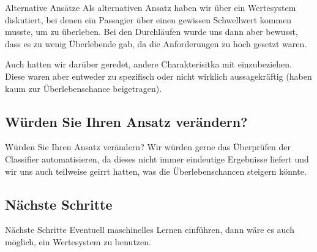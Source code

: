 \documentclass[compress]{beamer}
\begin{document}
\begin{frame}{Alternative Ansätze}
  Als alternativen Ansatz haben wir über ein Wertesystem diskutiert,
  bei denen ein Passagier über einen gewissen Schwellwert kommen
  musste, um zu überleben. Bei den Durchläufen wurde uns dann aber
  bewusst, dass es zu wenig Überlebende gab, da die Anforderungen
  zu hoch gesetzt waren.

  \bigskip Auch hatten wir darüber geredet, andere Charakterisitka mit
  einzubeziehen. Diese waren aber entweder zu spezifisch oder nicht
  wirklich aussagekräftig (haben kaum zur Überlebenschance beigetragen).
\end{frame}

\subsection{Würden Sie Ihren Ansatz verändern?}
\label{subsec:veraendern}

\begin{frame}{Würden Sie Ihren Ansatz verändern?}
  Wir würden gerne das Überprüfen der Classifier automatisieren, da
  dieses nicht immer eindeutige Ergebnisse liefert und wir uns auch
  teilweise geirrt hatten, was die Überlebenschancen steigern könnte.
\end{frame}

\subsection{Nächste Schritte}
\label{subsec:next}

\begin{frame}{Nächste Schritte}
  Eventuell maschinelles Lernen einführen, dann wäre es auch möglich,
  ein Wertesystem zu benutzen.
\end{frame}
\end{document}
